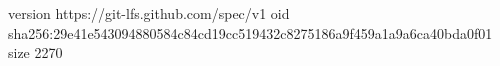 version https://git-lfs.github.com/spec/v1
oid sha256:29e41e543094880584c84cd19cc519432c8275186a9f459a1a9a6ca40bda0f01
size 2270
